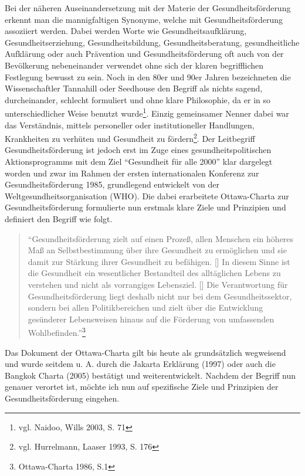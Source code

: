 Bei der näheren Auseinandersetzung mit der Materie der Gesundheitsförderung erkennt man die mannigfaltigen Synonyme, welche mit Gesundheitsförderung assoziiert werden. Dabei werden Worte wie Gesundheitsaufklärung, Gesundheitserziehung, Gesundheitsbildung, Gesundheitsberatung, gesundheitliche Aufklärung oder auch Prävention und Gesundheitsförderung oft auch von der Bevölkerung nebeneinander verwendet ohne sich der klaren begrifflichen Festlegung bewusst zu sein. Noch in den 80er und 90er Jahren bezeichneten die Wissenschaftler Tannahill oder Seedhouse den Begriff als nichts sagend, durcheinander, schlecht formuliert und ohne klare Philosophie, da er in so unterschiedlicher Weise benutzt wurde\footnote{vgl. Naidoo, Wills 2003, S. 71}. Einzig gemeinsamer Nenner dabei war das Verständnis, mittels personeller oder institutioneller Handlungen, Krankheiten zu verhüten und Gesundheit zu fördern\footnote{vgl. Hurrelmann, Laaser 1993, S. 176}. Der Leitbegriff Gesundheitsförderung ist jedoch erst im Zuge eines gesundheitspolitischen Aktionsprogramms mit dem Ziel "`Gesundheit für alle 2000"' klar dargelegt worden und zwar im Rahmen der ersten internationalen Konferenz zur Gesundheitsförderung 1985, grundlegend entwickelt von der Weltgesundheitsorganisation (WHO). Die dabei erarbeitete Ottawa-Charta zur Gesundheitsförderung formulierte nun erstmals klare Ziele und Prinzipien und definiert den Begriff wie folgt.

\begin{quotation}
"`Gesundheitsförderung zielt auf einen Prozeß, allen Menschen ein höheres Maß an Selbstbestimmung über ihre Gesundheit zu ermöglichen und sie damit zur Stärkung ihrer Gesundheit zu befähigen. [\punkte] In diesem Sinne ist die Gesundheit ein wesentlicher Bestandteil des alltäglichen Lebens zu verstehen und nicht als vorrangiges Lebensziel. [\punkte] Die Verantwortung für Gesundheitsförderung liegt deshalb nicht nur bei dem Gesundheitssektor, sondern bei allen Politikbereichen und zielt über die Entwicklung gesünderer Lebensweisen hinaus auf die Förderung von umfassenden Wohlbefinden."'\footnote{Ottawa-Charta 1986, S.1}
\end{quotation}

Das Dokument der Ottawa-Charta gilt bis heute als grundsätzlich wegweisend und wurde seitdem u. A. durch die Jakarta Erklärung (1997) oder auch die Bangkok Charta (2005) bestätigt und weiterentwickelt.
Nachdem der Begriff nun genauer verortet ist, möchte ich nun auf spezifische Ziele und Prinzipien der Gesundheitsförderung eingehen.

